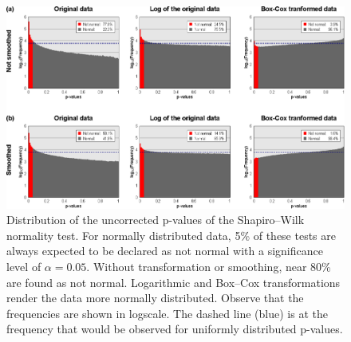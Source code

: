 \begin{figure}[!p]  %
\centering
\includegraphics[width=14cm]{images/histograms.eps}
\caption[Results of the Shapiro--Wilk normality test.]{Distribution of the uncorrected p-values of the Shapiro--Wilk normality test. For normally distributed data, 5\% of these tests are always expected to be declared as not normal with a significance level of $\mathsf{\alpha=0.05}$. Without transformation or smoothing, near 80\% are found as not normal. Logarithmic and Box--Cox transformations render the data more normally distributed. Observe that the frequencies are shown in logscale. The dashed line (blue) is at the frequency that would be observed for uniformly distributed p-values.}
\label{fig:histograms}
\end{figure}

